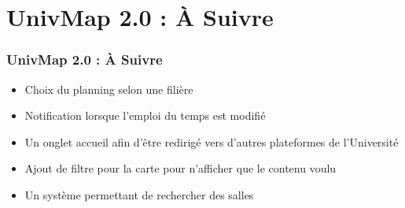 \documentclass{beamer}
\begin{document}
%
%
\section{UnivMap 2.0 : À Suivre}
%
%
\begin{frame}
  \frametitle{UnivMap 2.0 : À Suivre}

  \begin{itemize}
    \item Choix du planning selon une filière
    \item Notification lorsque l'emploi du temps est modifié
    \item Un onglet accueil afin d'être redirigé vers d'autres plateformes de l'Université
    \item Ajout de filtre pour la carte pour n'afficher que le contenu voulu
    \item Un système permettant de rechercher des salles
  \end{itemize}


\end{frame}



%
%
\end{document}

